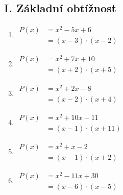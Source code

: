 \documentclass[11pt,a4paper]{article}
\begin{document}
\subsection*{I. Základní obtížnost}
\begin{enumerate}[label={},itemsep=9pt]
\item[\textbf{C001}] \(\displaystyle \begin{aligned}P(x)&=x^{2} - 5x + 6\\ &= \left(x - 3\right) \cdot \left(x - 2\right)\end{aligned}\)\par
\item[\textbf{C002}] \(\displaystyle \begin{aligned}P(x)&=x^{2} + 7x + 10\\ &= \left(x + 2\right) \cdot \left(x + 5\right)\end{aligned}\)\par
\item[\textbf{C003}] \(\displaystyle \begin{aligned}P(x)&=x^{2} + 2x - 8\\ &= \left(x - 2\right) \cdot \left(x + 4\right)\end{aligned}\)\par
\item[\textbf{C004}] \(\displaystyle \begin{aligned}P(x)&=x^{2} + 10x - 11\\ &= \left(x - 1\right) \cdot \left(x + 11\right)\end{aligned}\)\par
\item[\textbf{C005}] \(\displaystyle \begin{aligned}P(x)&=x^{2} + x - 2\\ &= \left(x - 1\right) \cdot \left(x + 2\right)\end{aligned}\)\par
\item[\textbf{C006}] \(\displaystyle \begin{aligned}P(x)&=x^{2} - 11x + 30\\ &= \left(x - 6\right) \cdot \left(x - 5\right)\end{aligned}\)\par
\end{enumerate}
\end{document}
